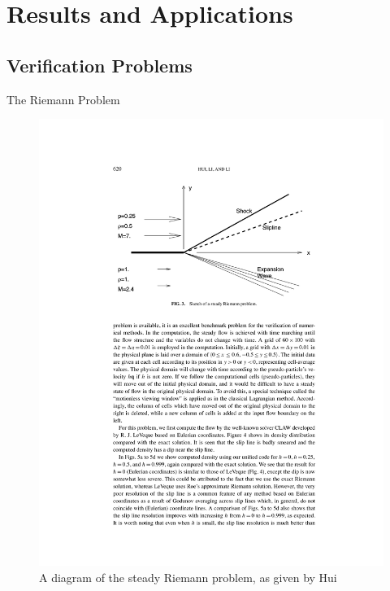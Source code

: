 \documentclass{beamer}
\begin{document}
\section{Results and Applications}

\subsection{Verification Problems}

\begin{frame}{The Riemann Problem}
  \begin{figure}
    \includegraphics[height=.7\textheight]{steadyriemann.pdf}
    \caption{A diagram of the steady Riemann problem, as given by
      Hui\cite{hui99}}
  \end{figure}
\end{frame}
\end{document}
